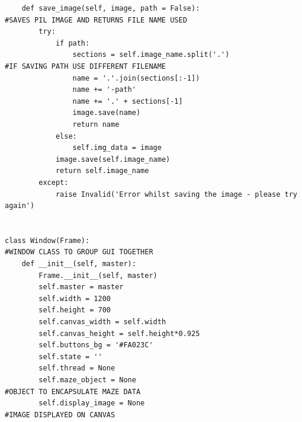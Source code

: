 \documentclass[titlepage]{article}
\begin{document}
\begin{changemargin}{-1in}{-1in}
\begin{verbatim}
    def save_image(self, image, path = False):                                  #SAVES PIL IMAGE AND RETURNS FILE NAME USED
        try:
            if path:
                sections = self.image_name.split('.')                           #IF SAVING PATH USE DIFFERENT FILENAME
                name = '.'.join(sections[:-1])
                name += '-path'
                name += '.' + sections[-1]
                image.save(name)
                return name
            else:
                self.img_data = image
            image.save(self.image_name)
            return self.image_name
        except:
            raise Invalid('Error whilst saving the image - please try again')
                
            
class Window(Frame):                                                            #WINDOW CLASS TO GROUP GUI TOGETHER
    def __init__(self, master):
        Frame.__init__(self, master)
        self.master = master
        self.width = 1200
        self.height = 700
        self.canvas_width = self.width
        self.canvas_height = self.height*0.925
        self.buttons_bg = '#FA023C'
        self.state = ''
        self.thread = None
        self.maze_object = None                                                 #OBJECT TO ENCAPSULATE MAZE DATA
        self.display_image = None                                               #IMAGE DISPLAYED ON CANVAS


\end{verbatim}
\end{changemargin}
\end{document}
